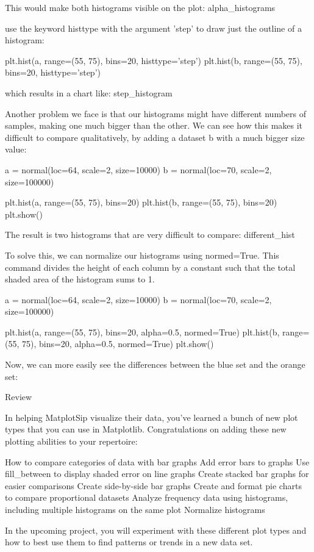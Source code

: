 \documentclass{journal}
\begin{document}
    This would make both histograms visible on the plot: alpha_histograms

    use the keyword histtype with the argument 'step' to draw just the outline of a histogram:

    plt.hist(a, range=(55, 75), bins=20, histtype='step')
    plt.hist(b, range=(55, 75), bins=20, histtype='step')

    which results in a chart like: step_histogram

Another problem we face is that our histograms might have different numbers of samples, making one much bigger than the other. We can see how this makes it difficult to compare qualitatively, by adding a dataset b with a much bigger size value:

a = normal(loc=64, scale=2, size=10000)
b = normal(loc=70, scale=2, size=100000)

plt.hist(a, range=(55, 75), bins=20)
plt.hist(b, range=(55, 75), bins=20)
plt.show()

The result is two histograms that are very difficult to compare: different_hist

To solve this, we can normalize our histograms using normed=True. This command divides the height of each column by a constant such that the total shaded area of the histogram sums to 1.

a = normal(loc=64, scale=2, size=10000)
b = normal(loc=70, scale=2, size=100000)

plt.hist(a, range=(55, 75), bins=20, alpha=0.5, normed=True)
plt.hist(b, range=(55, 75), bins=20, alpha=0.5, normed=True)
plt.show()

Now, we can more easily see the differences between the blue set and the orange set: 


Review

In helping MatplotSip visualize their data, you’ve learned a bunch of new plot types that you can use in Matplotlib. Congratulations on adding these new plotting abilities to your repertoire:

    How to compare categories of data with bar graphs
    Add error bars to graphs
    Use fill_between to display shaded error on line graphs
    Create stacked bar graphs for easier comparisons
    Create side-by-side bar graphs
    Create and format pie charts to compare proportional datasets
    Analyze frequency data using histograms, including multiple histograms on the same plot
    Normalize histograms

In the upcoming project, you will experiment with these different plot types and how to best use them to find patterns or trends in a new data set.
\end{document}
